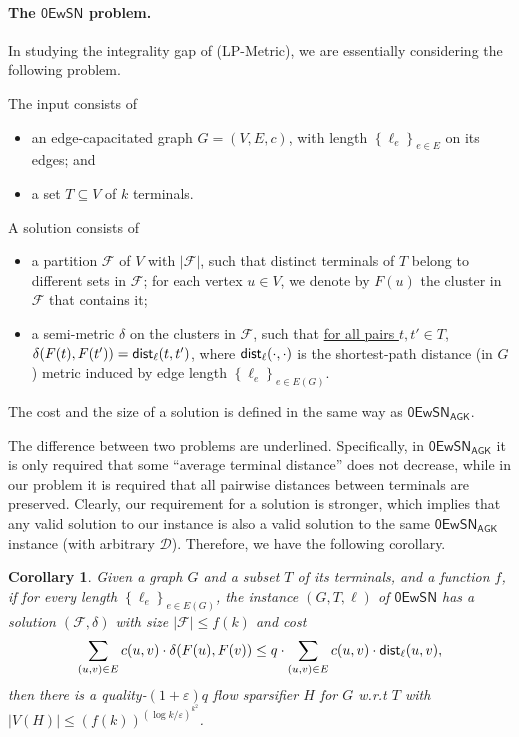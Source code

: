 \documentclass[11pt]{article}
\newtheorem{corollary}[theorem]{Corollary}
\theoremstyle{definition}
\newcommand{\set}[1]{\left\{ #1 \right\}}
\newcommand{\dset}{{\mathcal{D}}}
\newcommand{\fset}{{\mathcal{F}}}
\newcommand{\eps}{{\varepsilon}}
\newcommand{\dist}{\textnormal{\textsf{dist}}}
\newcounter{note}
\newcommand{\zesn}{\mathsf{0EwSN}}
\begin{document}
\begin{titlepage}
\paragraph{The $\zesn$ problem.}
In studying the integrality gap of (\textnormal{\textsf{LP-Metric}}), we are essentially considering the following problem.

The input consists of
\begin{itemize}
	\item an edge-capacitated graph $G=(V,E,c)$, with length $\set{\ell_e}_{e\in E}$ on its edges; and
	\item a set $T\subseteq V$ of $k$ terminals.
\end{itemize}
A solution consists of
\begin{itemize}
	\item a partition $\fset$ of $V$ with $|\fset|$, such that distinct terminals of $T$ belong to different sets in $\fset$; for each vertex $u\in V$, we denote by $F(u)$ the cluster in $\fset$ that contains it;
	\item a semi-metric $\delta$ on the clusters in $\fset$, such that \underline{for all pairs $t,t'\in T$, $\delta(F(t),F(t'))= \dist_{\ell}(t,t')$}, where $\dist_{\ell}(\cdot,\cdot)$ is the shortest-path distance (in $G$) metric induced by edge length $\set{\ell_e}_{e\in E(G)}$.
\end{itemize}
The cost and the size of a solution is defined in the same way as $\zesn_{\textsf{AGK}}$.


The difference between two problems are underlined. Specifically, in $\zesn_{\textsf{AGK}}$ it is only required that some ``average terminal distance'' does not decrease, while in our problem it is  required that all pairwise distances between terminals are preserved.
Clearly, our requirement for a solution is stronger, which implies that any valid solution to our instance is also a valid solution to the same $\zesn_{\textsf{AGK}}$ instance (with arbitrary $\dset$). Therefore, we have the following corollary.

\begin{corollary}
Given a graph $G$ and a subset $T$ of its terminals, and a function $f$, if for every length $\set{\ell_e}_{e\in E(G)}$, the instance $(G,T,\ell)$ of $\zesn$ has a solution $(\fset,\delta)$ with size $|\fset|\le f(k)$ and cost 
	\[\sum_{(u,v)\in E}c(u,v)\cdot\delta(F(u),F(v))\le q\cdot \sum_{(u,v)\in E}c(u,v)\cdot\dist_{\ell}(u,v),\] 
	then there is a quality-$(1+\eps) q$ flow sparsifier $H$ for $G$ w.r.t $T$ with $|V(H)|\le (f(k))^{(\log k/\eps)^{k^2}}$.
\end{corollary}


\end{titlepage}
\end{document}
